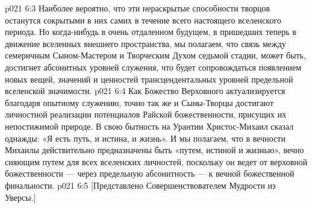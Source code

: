 \vs p021 6:3 Наиболее вероятно, что эти нераскрытые способности творцов останутся сокрытыми в них самих в течение всего настоящего вселенского периода. Но когда\hyp{}нибудь в очень отдаленном будущем, в пришедших теперь в движение вселенных внешнего пространства, мы полагаем, что связь между семеричным Сыном\hyp{}Мастером и Творческим Духом седьмой стадии, может быть, достигнет абсонитных уровней служения, что будет сопровождаться появлением новых вещей, значений и ценностей трансцендентальных уровней предельной вселенской значимости.
\vs p021 6:4 Как Божество Верховного актуализируется благодаря опытному служению, точно так же и Сыны\hyp{}Творцы достигают личностной реализации потенциалов Райской божественности, присущих их непостижимой природе. В свою бытность на Урантии Христос\hyp{}Михаил сказал однажды: «Я есть путь, и истина, и жизнь». И мы полагаем, что в вечности Михаилы действительно предназначены быть «путем, истиной и жизнью», вечно сияющим путем для всех вселенских личностей, поскольку он ведет от верховной божественности --- через предельную абсонитность --- к вечной божественной финальности.
\vsetoff
\vs p021 6:5 [Представлено Совершенствователем Мудрости из Уверсы.]
